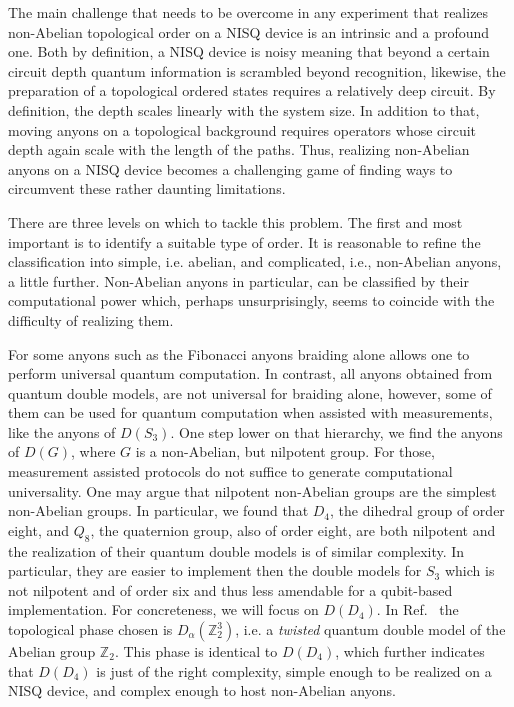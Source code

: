\documentclass[two column]{article}
\begin{document}
The main challenge that needs to be overcome in any experiment that realizes non-Abelian topological order on a NISQ device is an intrinsic and a profound one. Both by definition, a NISQ device is noisy meaning that beyond a certain circuit depth quantum information is scrambled beyond recognition, likewise, the preparation of a topological ordered states requires a relatively deep circuit. By definition, the depth scales linearly with the system size. In addition to that, moving anyons on a topological background requires operators whose circuit depth again scale with the length of the paths. Thus, realizing non-Abelian anyons on a NISQ device becomes a challenging game of finding ways to circumvent these rather daunting limitations. 

There are three levels on which to tackle this problem. The first and most important is to identify a suitable type of order. It is reasonable to refine the classification into simple, i.e. abelian, and complicated, i.e., non-Abelian anyons, a little further. Non-Abelian anyons in particular, can be classified by their computational power which, perhaps unsurprisingly, seems to coincide with the difficulty of realizing them. 

For some anyons such as the Fibonacci anyons braiding alone allows one to perform universal quantum computation. In contrast, all anyons obtained from quantum double models, are not universal for braiding alone, however, some of them can be used for quantum computation when assisted with measurements, like the anyons of $D(S_3)$. One step lower on that hierarchy, we find the anyons of $D(G)$, where $G$ is a non-Abelian, but nilpotent group. For those, measurement assisted protocols do not suffice to generate computational universality. One may argue that nilpotent non-Abelian groups are the simplest non-Abelian groups. In particular, we found that $D_4$, the dihedral group of order eight, and $Q_8$, the quaternion group, also of order eight, are both nilpotent and the realization of their quantum double models is of similar complexity. In particular, they are easier to implement then the double models for $S_3$ which is not nilpotent and of order six and thus less amendable for a qubit-based implementation. For concreteness, we will focus on $D(D_4)$. In Ref.~\cite{iqbal2023creation} the topological phase chosen is $D_\alpha(\mathbb Z_2^3)$, i.e. a \emph{twisted} quantum double model of the Abelian group $\mathbb Z_2$. This phase is identical to $D(D_4)$, which further indicates that $D(D_4)$ is just of the right complexity, simple enough to be realized on a NISQ device, and complex enough to host non-Abelian anyons.
\end{document}
